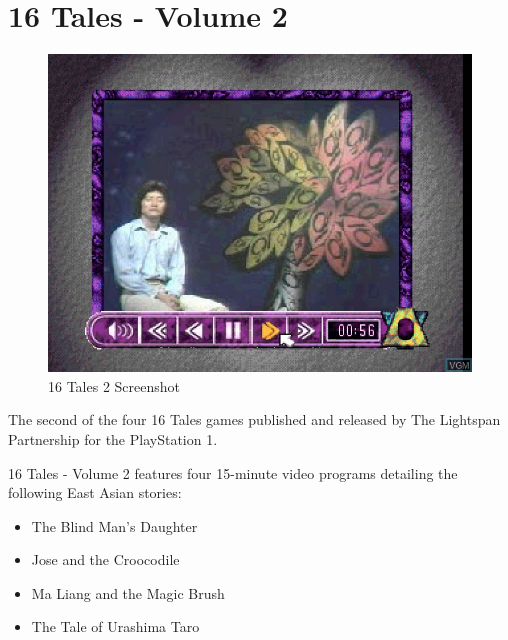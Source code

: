 \chapter{16 Tales - Volume 2}

\begin{figure}[H]
    \centering
    \includegraphics[width=\textwidth/2]{"./Games/16Tales/Images/16Tales2Screenshot.png"}
    \caption{16 Tales 2 Screenshot}
\end{figure}

The second of the four 16 Tales games published and released by The Lightspan Partnership for the PlayStation 1.

16 Tales - Volume 2 features four 15-minute video programs detailing the following East Asian stories:
\begin{itemize}
    \item The Blind Man's Daughter
    \item Jose and the Croocodile
    \item Ma Liang and the Magic Brush
    \item The Tale of Urashima Taro
\end{itemize}

